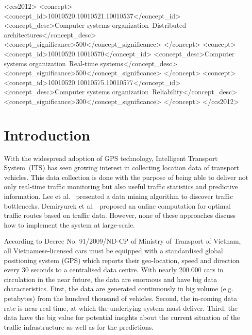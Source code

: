 \documentclass{sig-alternate-05-2015}
\begin{document}
%
%

\begin{CCSXML}
<ccs2012>
<concept>
<concept_id>10010520.10010521.10010537</concept_id>
<concept_desc>Computer systems organization~Distributed architectures</concept_desc>
<concept_significance>500</concept_significance>
</concept>
<concept>
<concept_id>10010520.10010570</concept_id>
<concept_desc>Computer systems organization~Real-time systems</concept_desc>
<concept_significance>500</concept_significance>
</concept>
<concept>
<concept_id>10010520.10010575.10010577</concept_id>
<concept_desc>Computer systems organization~Reliability</concept_desc>
<concept_significance>300</concept_significance>
</concept>
</ccs2012>
\end{CCSXML}



%
%

%
%
\printccsdesc




\section{Introduction}

With the widespread adoption of GPS technology, Intelligent Transport System~(ITS) has seen growing interest in collecting location data of transport vehicles. This data collection is done with the purpose of being able to deliver not only real-time traffic monitoring but also useful traffic statistics and predictive information. Lee et al.~\cite{Lee2011} presented a data mining algorithm to discover traffic bottlenecks. Demiryurek et al.~\cite{Demiryurek2010} proposed an online computation for optimal traffic routes based on traffic data. However, none of these approaches discuss how to implement the system at large-scale.


According to Decree No. 91/2009/ND-CP of Ministry of Transport of Vietnam, all Vietnamese-licensed cars must be equipped with a standardised global positioning system (GPS) which reports their geo-location, speed and direction every 30 seconds to a centralised data centre. With nearly 200.000 cars in circulation in the near future, the data are enormous and have big data characteristics. First, the data are generated continuously in big volume (e.g. petabytes) from the hundred thousand of vehicles. Second, the in-coming data rate is near real-time, at which the underlying system must deliver. Third, the data have the big value for potential insights about the current situation of the traffic infrastructure as well as for the predictions. 
\end{document}
